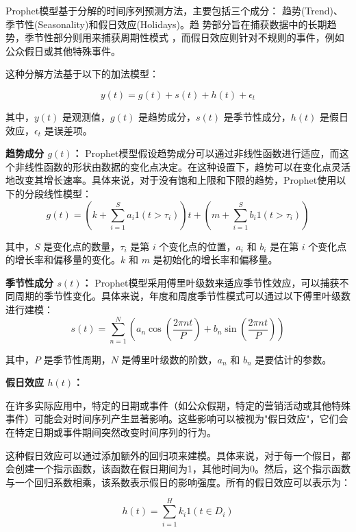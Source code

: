 \documentclass[a4paper,AutoFakeBold,oneside,12pt]{book}
\begin{document}
Prophet模型基于分解的时间序列预测方法，主要包括三个成分：
趋势(Trend)、季节性(Seasonality)和假日效应(Holidays)。趋
势部分旨在捕获数据中的长期趋势，季节性部分则用来捕获周期性模式
，而假日效应则针对不规则的事件，例如公众假日或其他特殊事件。

这种分解方法基于以下的加法模型：

\begin{equation}
y(t) = g(t) + s(t) + h(t) + \epsilon_t
\end{equation}

其中，$y(t)$ 是观测值，$g(t)$ 是趋势成分，$s(t)$ 是季节性成分，$h(t)$ 是假日效应，$\epsilon_t$ 是误差项。

\textbf{趋势成分 $g(t)$：} Prophet模型假设趋势成分可以通过非线性函数进行适应，而这个非线性函数的形状由数据的变化点决定。在这种设置下，趋势可以在变化点灵活地改变其增长速率。具体来说，对于没有饱和上限和下限的趋势，Prophet使用以下的分段线性模型：
\begin{equation}
g(t) = \left( k + \sum_{i=1}^{S} a_i 1(t>\tau_i) \right) t + \left( m + \sum_{i=1}^{S} b_i 1(t>\tau_i) \right)
\end{equation}

其中，$S$ 是变化点的数量，$\tau_i$ 是第 $i$ 个变化点的位置，$a_i$ 和 $b_i$ 是在第 $i$ 个变化点的增长率和偏移量的变化。$k$ 和 $m$ 是初始化的增长率和偏移量。

\textbf{季节性成分 $s(t)$：} Prophet模型采用傅里叶级数来适应季节性效应，可以捕获不同周期的季节性变化。具体来说，年度和周度季节性模式可以通过以下傅里叶级数进行建模：
\begin{equation}
s(t) = \sum_{n=1}^{N} \left( a_n \cos\left(\frac{2\pi nt}{P}\right) + b_n \sin\left(\frac{2\pi nt}{P}\right) \right)
\end{equation}

其中，$P$ 是季节性周期，$N$ 是傅里叶级数的阶数，$a_n$ 和 $b_n$ 是要估计的参数。

\textbf{假日效应 $h(t)$：}

在许多实际应用中，特定的日期或事件（如公众假期，特定的营销活动或其他特殊事件）可能会对时间序列产生显著影响。这些影响可以被视为"假日效应"，它们会在特定日期或事件期间突然改变时间序列的行为。

这种假日效应可以通过添加额外的回归项来建模。具体来说，对于每一个假日，都会创建一个指示函数，该函数在假日期间为1，其他时间为0。然后，这个指示函数与一个回归系数相乘，该系数表示假日的影响强度。所有的假日效应可以表示为：

\begin{equation}
h(t) = \sum_{i=1}^{H} k_i 1(t \in D_i)
\end{equation}
\end{document}
